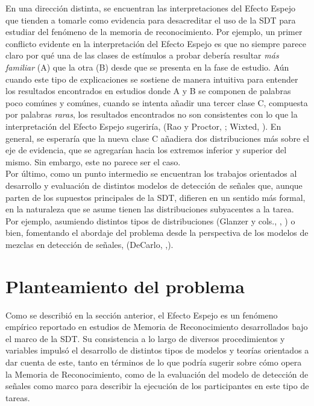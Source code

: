 En una dirección distinta, se encuentran las interpretaciones del Efecto Espejo que tienden a tomarle como evidencia para desacreditar el uso de la SDT para estudiar del fenómeno de la memoria de reconocimiento. Por ejemplo, un primer conflicto evidente en la interpretación del Efecto Espejo es que no siempre parece claro por qué una de las clases de estímulos a probar debería resultar \textit{más familiar} (A) que la otra (B) desde que se presenta en la fase de estudio. Aún cuando este tipo de explicaciones se sostiene de manera intuitiva para entender los resultados encontrados en estudios donde A y B se componen de palabras poco comúnes y comúnes, cuando se intenta añadir una tercer clase C, compuesta por palabras \textit{raras}, los resultados encontrados no son consistentes con lo que la interpretación del Efecto Espejo sugeriría, (Rao y Proctor, \citeyear{Rao1984}; Wixted, \citeyear{Wixted1992}). En general, se esperaría que la nueva clase C añadiera dos distribuciones más sobre el eje de evidencia, que se agregarían hacia los extremos inferior y superior del mismo. Sin embargo, este no parece ser el caso.\\

Por último, como un punto intermedio se encuentran los trabajos orientados al desarrollo y evaluación de distintos modelos de detección de señales que, aunque parten de los supuestos principales de la SDT, difieren en un sentido más formal, en la naturaleza que se asume tienen las distribuciones subyacentes a la tarea. Por ejemplo, asumiendo distintos tipos de distribuciones (Glanzer y cols., \citeyear{Glanzer1993}, \citeyear{Glanzer2009}) o bien, fomentando el abordaje del problema desde la perspectiva de los modelos de mezclas en detección de señales, (DeCarlo, \citeyear{DeCarlo2002} ,\citeyear{DeCarlo2007}).\\

\section{Planteamiento del problema}

Como se describió en la sección anterior, el Efecto Espejo es un fenómeno empírico reportado en estudios de Memoria de Reconocimiento desarrollados bajo el marco de la SDT. Su consistencia a lo largo de diversos procedimientos y variables impulsó el desarrollo de distintos tipos de modelos y teorías orientados a dar cuenta de este, tanto en términos de lo que podría sugerir sobre cómo opera la Memoria de Reconocimiento, como de la evaluación del modelo de detección de señales como marco para describir la ejecución de los participantes en este tipo de tareas.\\

